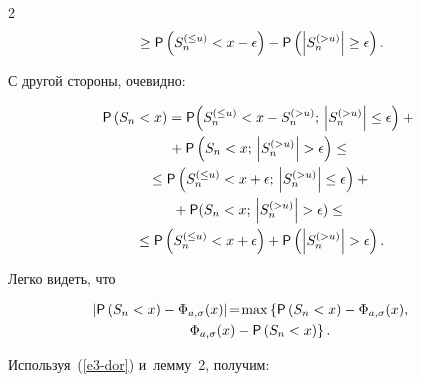 \begin{multicols}{2}
\begin{multline}
{}\ge{\sf P}\left(S_n^{(\le u)}<x-\epsilon\right)-{\sf P}\left(

\left\vert S_n^{(>u)}\right\vert \ge\epsilon\right).

\label{e2-dor}

\end{multline}

С другой стороны, очевидно:

\begin{multline}

{\sf P}\left(S_n<x\right)={\sf P}\!\left(S_n^{(\le u)}<x-S_n^{(>u)};\,\left\vert S_n^{(>u)}\right\vert

\le\epsilon\right)+{}\\

{}+

{\sf P}\left(S_n<x;\,\left\vert S_n^{(>u)}\right\vert >\epsilon\right)\le

{}\\

{}

\le{\sf P}\left(S_n^{(\le u)}<x+\epsilon;\,\left\vert S_n^{(>u)}\right\vert \le\epsilon\right)+{}\\

{}+

{\sf P}(S_n<x;\,\left\vert S_n^{(>u)}\right\vert >\epsilon)\le

{}\\

{}\le{\sf P}\left(S_n^{(\le u)}<x+\epsilon\right)+{\sf P}\left(\left\vert S_n^{(>u)}\right\vert

>\epsilon\right).

\label{e3-dor}

\end{multline}

Легко видеть, что

\begin{multline}

\hspace*{-9.96pt}\left\vert {\sf P}\left(S_n<x\right)-\Phi_{a,\sigma}(x)\right\vert\!=\!

\max\left\{{\sf P}\left(S_n<x\right)-\Phi_{a,\sigma}(x),\right.\\

\left.\Phi_{a,\sigma}(x)-{\sf P}\left(S_n<x\right)\right\}.

\label{e4-dor}

\end{multline}

Используя~(\ref{e3-dor}) и~лемму~2, получим:


\end{multicols}
